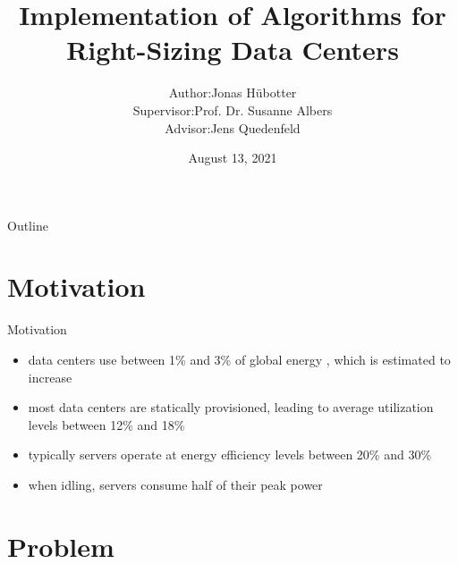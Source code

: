 \documentclass{beamer}
\begin{document}
\title[Implementation of Algorithms for Right-Sizing Data Centers]{Implementation of Algorithms for \\ Right-Sizing Data Centers}
\author{\begin{tabular}{r@{ }l} 
Author:      & Jonas Hübotter \\[1ex] 
Supervisor:  & Prof. Dr. Susanne Albers\\
Advisor:     & Jens Quedenfeld\\
\end{tabular}}
\date{August 13, 2021}

\begin{frame}
  \titlepage
\end{frame}

\begin{frame}{Outline}
 \tableofcontents[subsectionstyle=hide, subsubsectionstyle=hide]
\end{frame}

\section{Motivation}

\begin{frame}{Motivation}
    \begin{itemize}
        \item data centers use between 1\% and 3\% of global energy , which is estimated to increase\pause
        \item most data centers are statically provisioned, leading to average utilization levels between 12\% and 18\%\pause
        \item typically servers operate at energy efficiency levels between 20\% and 30\%\pause
        \item when idling, servers consume half of their peak power\footnotemark[\value{footnote}]
    \end{itemize}
\end{frame}

\section{Problem}
\end{document}
